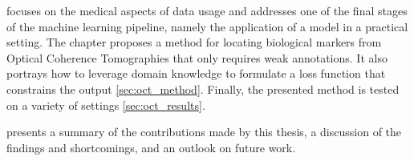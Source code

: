  focuses on the medical aspects of data usage and addresses one of the final stages of the machine learning pipeline, namely the application of a model in a practical setting. The chapter proposes a method for locating biological markers from Optical Coherence Tomographies that only requires weak annotations. It also portrays how to leverage domain knowledge to formulate a loss function that constrains the output \cref{sec:oct_method}. Finally, the presented method is tested on a variety of settings \cref{sec:oct_results}.

 presents a summary of the contributions made by this thesis, a discussion of the findings and shortcomings, and an outlook on future work.